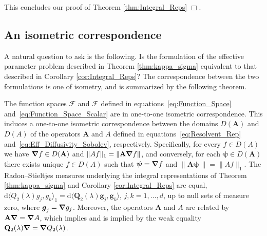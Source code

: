 \documentclass[leqno,onefignum,onetabnum]{siamltex1213}
\renewcommand{\d}{\mathrm{d}}
\newcommand{\Ab}{\mathbf{A}}
\newcommand{\Qb}{\mathbf{Q}}
\newcommand{\Fc}{\mathcal{F}}
\newcommand{\Fs}{\mathscr{F}}
\newcommand\bnabla{\mbox{\boldmath${\nabla}$}}
\newcommand{\vecg}{\boldsymbol{g}}
\newcommand{\vecpsi}{\boldsymbol{\psi}}
\begin{document}
This concludes our proof of Theorem
\ref{thm:Integral_Reps} $\Box$.    


\subsection{An isometric
  correspondence} \label{sec:Isometric_Correspondence} 
%
A natural question to ask is the following. Is the formulation of the
effective parameter problem described in Theorem \ref{thm:kappa_sigma}
equivalent to that described in Corollary \ref{cor:Integral_Reps}?
The correspondence between the two formulations is one of isometry,
and is summarized by the following theorem. 
%
\begin{theorem}\label{thm:Formulation_Equivalence}
%  
The function spaces $\Fc$ and $\Fs$ defined in
equations~\eqref{eq:Function_Space}
and~\eqref{eq:Function_Space_Scalar} are in one-to-one isometric
correspondence. This induces a one-to-one 
isometric correspondence between the domains $D(\Ab)$ and $D(A)$ of
the operators $\Ab$ and $A$ defined in
equations~\eqref{eq:Resolvent_Rep}
and~\eqref{eq:Eff_Diffusivity_Sobolev}, 
respectively. Specifically, for every $f\in D(A)$ we have
$\bnabla f\in D(\Ab)$ and $\|Af\|_1=\|\Ab\bnabla f\|$, and conversely, for each
$\vecpsi\in D(\Ab)$ there exists unique $f\in D(A)$ such that
$\vecpsi=\bnabla f$  and $\|\Ab\vecpsi\,\|=\|Af\|_1$. The Radon--Stieltjes
measures underlying the integral representations of Theorem
\ref{thm:kappa_sigma} and Corollary \ref{cor:Integral_Reps} are equal,
$\d\langle Q_2(\lambda)g_j,g_k\rangle_1=\d\langle\Qb_2(\lambda)\vecg_j,\vecg_k\rangle$, $j,k=1,\ldots,d$,
up to null sets of measure zero, where
$\vecg_j=\bnabla g_j$. Moreover, the operators $\Ab$ and $A$ are
related by $\Ab\bnabla =\bnabla A$, which implies and is implied by the
weak equality $\Qb_2(\lambda)\bnabla =\bnabla Q_2(\lambda)$.
%
\end{theorem}
%
\end{document}
